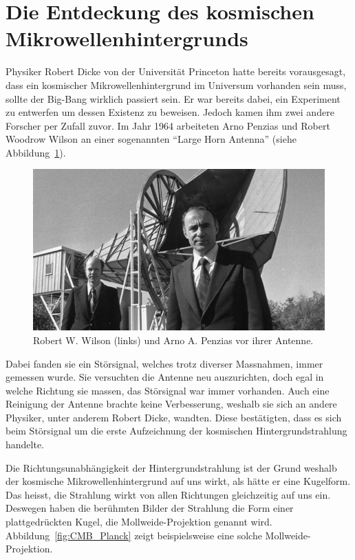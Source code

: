 \section{Die Entdeckung des kosmischen Mikrowellenhintergrunds}
Physiker Robert Dicke von der Universität Princeton hatte bereits vorausgesagt, 
%
dass ein kosmischer Mikrowellenhintergrund im Universum vorhanden sein muss, 
sollte der Big-Bang wirklich passiert sein. Er war bereits dabei, ein 
Experiment zu entwerfen um dessen Existenz zu beweisen. Jedoch kamen ihm zwei 
andere Forscher per Zufall zuvor.
Im Jahr 1964 arbeiteten Arno Penzias und Robert Woodrow Wilson an einer 
%
%
sogenannten ``Large Horn Antenna'' (siehe Abbildung~\ref{fig:wilson_penzias}).
\begin{figure}
	\centering
	\includegraphics[width=\linewidth]{cmb/images/penzias-wilson-large-horn-antenna.jpg}
	\caption{Robert W. Wilson (links) und Arno A. Penzias vor ihrer Antenne.}
	\label{fig:wilson_penzias}
\end{figure}
Dabei fanden sie ein Störsignal, welches trotz diverser Massnahmen, immer 
gemessen wurde.
Sie versuchten die Antenne neu auszurichten, doch egal in welche Richtung sie 
massen, das Störsignal war immer vorhanden.
Auch eine Reinigung der Antenne brachte keine Verbesserung, weshalb sie sich an 
andere Physiker, unter anderem Robert Dicke, wandten. Diese bestätigten, dass 
es sich beim Störsignal um die erste Aufzeichnung der kosmischen 
Hintergrundstrahlung handelte.

Die Richtungsunabhängigkeit der Hintergrundstrahlung ist der Grund weshalb der 
kosmische Mikrowellenhintergrund auf uns wirkt, als hätte er eine Kugelform. 
Das heisst, die Strahlung wirkt von allen Richtungen gleichzeitig auf uns ein.
Deswegen haben die berühmten Bilder der Strahlung die Form einer 
plattgedrückten Kugel, die Mollweide-Projektion genannt wird. 
%
Abbildung~\ref{fig:CMB_Planck} zeigt beispielsweise eine solche 
Mollweide-Projektion.

